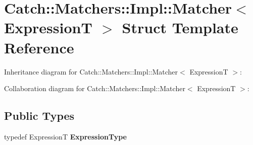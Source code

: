 \hypertarget{structCatch_1_1Matchers_1_1Impl_1_1Matcher}{}\section{Catch\+:\+:Matchers\+:\+:Impl\+:\+:Matcher$<$ ExpressionT $>$ Struct Template Reference}
\label{structCatch_1_1Matchers_1_1Impl_1_1Matcher}


Inheritance diagram for Catch\+:\+:Matchers\+:\+:Impl\+:\+:Matcher$<$ ExpressionT $>$\+:


Collaboration diagram for Catch\+:\+:Matchers\+:\+:Impl\+:\+:Matcher$<$ ExpressionT $>$\+:
\subsection*{Public Types}
\begin{DoxyCompactItemize}
\item 
typedef ExpressionT {\bfseries Expression\+Type}\hypertarget{structCatch_1_1Matchers_1_1Impl_1_1Matcher_a7f5068cbacd1eed06cf243e63446e7e1}{}\label{structCatch_1_1Matchers_1_1Impl_1_1Matcher_a7f5068cbacd1eed06cf243e63446e7e1}

\end{DoxyCompactItemize}
